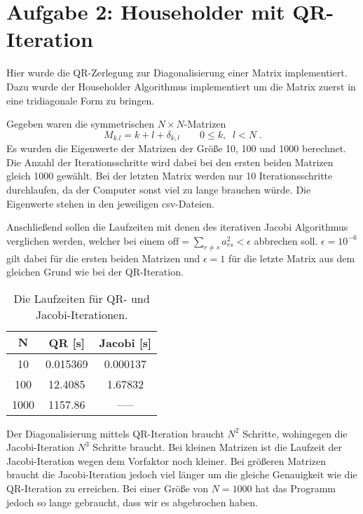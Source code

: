 \newpage
\section{Aufgabe 2: Householder mit QR-Iteration}
\label{sec:auf2}

Hier wurde die QR-Zerlegung zur Diagonalisierung einer Matrix implementiert. Dazu wurde der Householder Algorithmus implementiert um die Matrix zuerst in eine tridiagonale Form zu bringen.

Gegeben waren die symmetrischen $N \times N$-Matrizen
\begin{equation}
    M_{k.l} = k + l + \delta_{k,l} \qquad 0 \leq k, \;\; l < N \;.
\end{equation}
Es wurden die Eigenwerte der Matrizen der Größe 10, 100 und 1000 berechnet. Die Anzahl der Iterationsschritte wird dabei bei den ersten beiden Matrizen gleich 1000 gewählt. Bei der letzten Matrix werden nur 10 Iterationsschritte durchlaufen, da der Computer sonst viel zu lange brauchen würde. Die Eigenwerte stehen in den jeweiligen csv-Dateien.

Anschließend sollen die Laufzeiten mit denen des iterativen Jacobi Algorithmus verglichen werden, welcher bei einem $\text{off} = \sum_{r \neq s} a_{rs}^2 < \epsilon$ abbrechen soll. $\epsilon = 10^{-6}$ gilt dabei für die ersten beiden Matrizen und $\epsilon = 1$ für die letzte Matrix aus dem gleichen Grund wie bei der QR-Iteration.

\setlength{\arrayrulewidth}{0.25mm}
\renewcommand{\arraystretch}{1.3}
\begin{table}[h!]
    \begin{center}
      \caption{Die Laufzeiten für QR- und Jacobi-Iterationen.}
      \label{tab:table1}
      \begin{tabular}{c||c|c}
        $\mathbf{N}$ & \textbf{QR} [s] & \textbf{Jacobi} [s] \\
        \hline\hline
        10 & 0.015369 & 0.000137 \\
        \hline
        100 & 12.4085 & 1.67832 \\
        \hline
        1000 & 1157.86 & ----- \\
      \end{tabular}
    \end{center}
  \end{table}

Der Diagonalisierung mittels QR-Iteration braucht $N^2$ Schritte, wohingegen die Jacobi-Iteration $N^3$ Schritte braucht.
Bei kleinen Matrizen ist die Laufzeit der Jacobi-Iteration wegen dem Vorfaktor noch kleiner. Bei größeren Matrizen braucht die Jacobi-Iteration jedoch viel länger um die gleiche Genauigkeit wie die QR-Iteration zu erreichen. Bei einer Größe von $N=1000$ hat das Programm jedoch so lange gebraucht, dass wir es abgebrochen haben.


